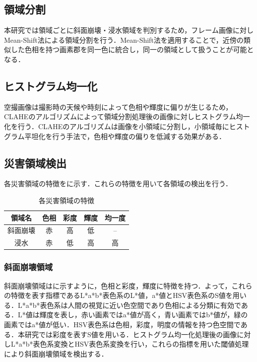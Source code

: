 \documentclass[a4paper, twocolumn, xelatex, 8pt, ja=standard, Ligatures=TeX]{bxjsarticle}
\begin{document}
\subsection{領域分割}
	本研究では領域ごとに斜面崩壊・浸水領域を判別するため，フレーム画像に対しMean-Shift法による領域分割を行う．Mean-Shift法を適用することで，近傍の類似した色相を持つ画素郡を同一色に統合し，同一の領域として扱うことが可能となる．

\subsection{ヒストグラム均一化}
	空撮画像は撮影時の天候や時刻によって色相や輝度に偏りが生じるため，CLAHEのアルゴリズムによって領域分割処理後の画像に対しヒストグラム均一化を行う．CLAHEのアルゴリズムは画像を小領域に分割し，小領域毎にヒストグラム平坦化を行う手法で，色相や輝度の偏りを低減する効果がある．
	
\subsection{災害領域検出}
	各災害領域の特徴をに示す．これらの特徴を用いて各領域の検出を行う．

	\begin{table}[b]
		\centering
		\caption{各災害領域の特徴}
		\label{tab01}
		\begin{tabular}{c c c c c}
			\hline
			領域名 & 色相 & 彩度 & 輝度 & 均一度 \\
			\hline
			\hline
			斜面崩壊 & 赤 & 高 & 低 & -- \\
			浸水 & 赤 & 低 & 高 & 高 \\ \hline
		\end{tabular}
	\end{table}

	\subsubsection{斜面崩壊領域}
		斜面崩壊領域はに示すように，色相と彩度，輝度に特徴を持つ．よって，これらの特徴を表す指標であるL*a*b*表色系のL*値，a*値とHSV表色系のS値を用いる．L*a*b*表色系は人間の視覚に近い色空間であり色相による分類に有効である．L*値は輝度を表し，赤い画素ではa*値が高く，青い画素ではb*値が，緑の画素ではa*値が低い．HSV表色系は色相，彩度，明度の情報を持つ色空間である．本研究では彩度を表すS値を用いる．ヒストグラム均一化処理後の画像に対しL*a*b*表色系変換とHSV表色系変換を行い，これらの指標を用いた閾値処理により斜面崩壊領域を検出する．
	
\end{document}
